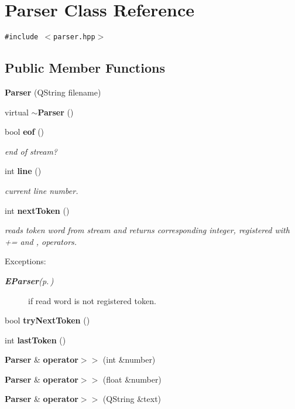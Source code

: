 \section{Parser Class Reference}
\label{classParser}
{\tt \#include $<$parser.hpp$>$}

\subsection*{Public Member Functions}
\begin{CompactItemize}
\item 
{\bf Parser} (QString filename)
\item 
virtual {\bf $\sim$Parser} ()
\item 
bool {\bf eof} ()
\begin{CompactList}\small\item\em end of stream? \item\end{CompactList}\item 
int {\bf line} ()
\begin{CompactList}\small\item\em current line number. \item\end{CompactList}\item 
int {\bf next\-Token} ()
\begin{CompactList}\small\item\em reads token word from stream and returns corresponding integer, registered with += and , operators. \begin{Desc}
\item[Exceptions:]
\begin{description}
\item[{\em {\bf EParser}{\rm (p.\,\pageref{classEParser})}}]if read word is not registered token. \end{description}
\end{Desc}
\item\end{CompactList}\item 
bool {\bf try\-Next\-Token} ()
\item 
int {\bf last\-Token} ()
\item 
{\bf Parser} \& {\bf operator$>$$>$} (int \&number)
\item 
{\bf Parser} \& {\bf operator$>$$>$} (float \&number)
\item 
{\bf Parser} \& {\bf operator$>$$>$} (QString \&text)
\item 

\end{CompactItemize}
